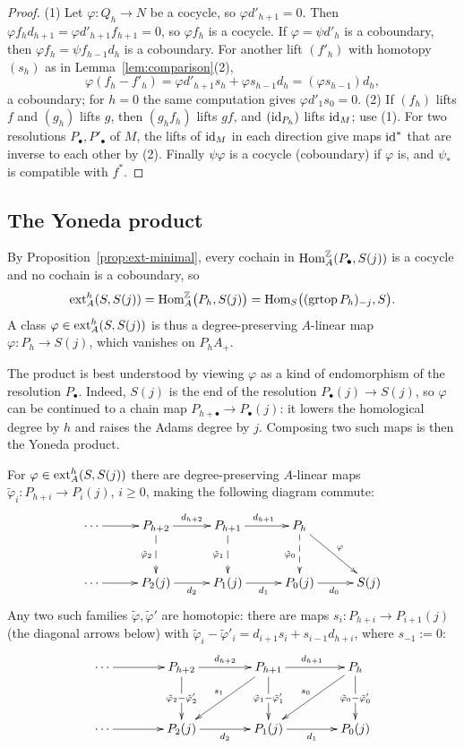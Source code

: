 \begin{proof}
(1) Let $\varphi:Q_h\to N$ be a cocycle, so $\varphi d'_{h+1}=0$.
Then $\varphi f_hd_{h+1}=\varphi d'_{h+1}f_{h+1}=0$, so $\varphi f_h$ is a cocycle.
If $\varphi=\psi d'_h$ is a coboundary, then $\varphi f_h=\psi f_{h-1}d_h$ is a coboundary.
For another lift $(f'_h)$ with homotopy $(s_h)$ as in Lemma~\ref{lem:comparison}(2),
\[
\varphi(f_h-f'_h)=\varphi d'_{h+1}s_h+\varphi s_{h-1}d_h=(\varphi s_{h-1})d_h,
\]
a coboundary; for $h=0$ the same computation gives $\varphi d'_1s_0=0$.
(2) If $(f_h)$ lifts $f$ and $(g_h)$ lifts $g$, then $(g_hf_h)$ lifts $gf$, and $(\operatorname{id}_{P_h})$ lifts $\operatorname{id}_M$; use (1).
For two resolutions $P_\bullet,P'_\bullet$ of $M$, the lifts of $\operatorname{id}_M$ in each direction give maps $\operatorname{id}^*$ that are inverse to each other by (2).
Finally $\psi\varphi$ is a cocycle (coboundary) if $\varphi$ is, and $\psi_*$ is compatible with $f^*$.
\end{proof}

\subsection{The Yoneda product}

By Proposition~\ref{prop:ext-minimal}, every cochain in $\operatorname{Hom}\nolimits_A^{\mathbb{Z}}(P_\bullet,S(j))$ is a cocycle and no cochain is a coboundary, so
\[
\operatorname{ext}\nolimits_A^h(S,S(j))=\operatorname{Hom}\nolimits_A^{\mathbb{Z}}\bigl(P_h,S(j)\bigr)=\operatorname{Hom}\nolimits_S\bigl((\operatorname{grtop}\nolimits P_h)_{-j},S\bigr).
\]
A class $\varphi\in\operatorname{ext}\nolimits_A^h(S,S(j))$ is thus a degree-preserving $A$-linear map $\varphi:P_h\to S(j)$, which vanishes on $P_hA_+$.

The product is best understood by viewing $\varphi$ as a kind of endomorphism of the resolution $P_\bullet$.
Indeed, $S(j)$ is the end of the resolution $P_\bullet(j)\to S(j)$, so $\varphi$ can be continued to a chain map $P_{h+\bullet}\to P_\bullet(j)$: it lowers the homological degree by $h$ and raises the Adams degree by $j$.
Composing two such maps is then the Yoneda product.

\begin{lemma}\label{lem:yoneda-lift}
For $\varphi\in\operatorname{ext}\nolimits_A^h(S,S(j))$ there are degree-preserving $A$-linear maps $\tilde\varphi_i:P_{h+i}\to P_i(j)$, $i\geq0$, making the following diagram commute:
\[
\xymatrix@C=28pt@R=30pt{
\cdots\ar[r]&P_{h+2}\ar[r]^{d_{h+2}}\ar@{-->}[d]_{\tilde\varphi_2}&P_{h+1}\ar[r]^{d_{h+1}}\ar@{-->}[d]_{\tilde\varphi_1}&P_h\ar@{-->}[d]_{\tilde\varphi_0}\ar[dr]^{\varphi}&\\
\cdots\ar[r]&P_2(j)\ar[r]_{d_2}&P_1(j)\ar[r]_{d_1}&P_0(j)\ar[r]_{d_0}&S(j)
}
\]
Any two such families $\tilde\varphi,\tilde\varphi'$ are homotopic: there are maps $s_i:P_{h+i}\to P_{i+1}(j)$ (the diagonal arrows below) with $\tilde\varphi_i-\tilde\varphi'_i=d_{i+1}s_i+s_{i-1}d_{h+i}$, where $s_{-1}:=0$:
\[
\xymatrix@C=40pt@R=34pt{
\cdots\ar[r]&P_{h+2}\ar[r]^{d_{h+2}}\ar[d]|{\tilde\varphi_2-\tilde\varphi'_2}&P_{h+1}\ar[r]^{d_{h+1}}\ar[d]|{\tilde\varphi_1-\tilde\varphi'_1}\ar[dl]_{s_1}&P_h\ar[d]|{\tilde\varphi_0-\tilde\varphi'_0}\ar[dl]_{s_0}\\
\cdots\ar[r]&P_2(j)\ar[r]_{d_2}&P_1(j)\ar[r]_{d_1}&P_0(j)
}
\]
\end{lemma}

